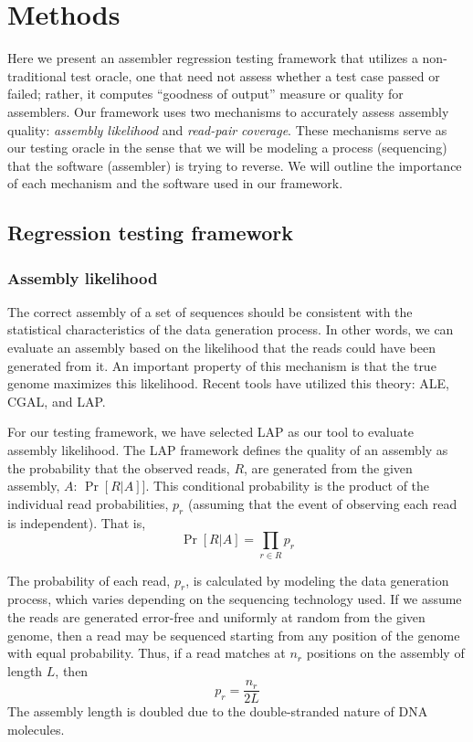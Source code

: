 \documentclass[12pt,\mydriver]{thesis}
\begin{document}
\section{Methods}
\label{methods}

Here we present an assembler regression testing framework that utilizes a non-traditional test oracle, one that need not assess whether a test case passed or failed; rather, it computes ``goodness of output'' measure or quality for assemblers.
Our framework uses two mechanisms to accurately assess assembly quality: \emph{assembly likelihood} and \emph{read-pair coverage}.
These mechanisms serve as our testing oracle in the sense that we will be modeling a process (sequencing) that the software (assembler) is trying to reverse.
We will outline the importance of each mechanism and the software used in our framework.


\subsection{Regression testing framework}
\subsubsection{Assembly likelihood}

The correct assembly of a set of sequences should be consistent with the statistical characteristics of the data generation process\cite{myers1995toward}.
In other words, we can evaluate an assembly based on the likelihood that the reads could have been generated from it.
An important property of this mechanism is that the true genome maximizes this likelihood\cite{LAP}.
Recent tools have utilized this theory: ALE\cite{clark2013ale}, CGAL\cite{rahman2013cgal}, and LAP\cite{LAP}.

For our testing framework, we have selected LAP as our tool to evaluate assembly likelihood.
The LAP framework defines the quality of an assembly as the probability that the observed reads, $R$, are generated from the given assembly, $A$: $\Pr[R|A]]$.
This conditional probability is the product of the individual read probabilities, $p_r$ (assuming that the event of observing each read is independent).  That is,
\begin{equation}
  \label{probability_reads_given_assembly}
  \Pr[R \vert A]=\prod_{r \in R} p_r
\end{equation}

The probability of each read, $p_r$, is calculated by modeling the data generation process, which varies depending on the sequencing technology used.
If we assume the reads are generated error-free and uniformly at random from the given genome, then a read may be sequenced starting from any position of the genome with equal probability.
Thus, if a read
matches at $n_r$ positions on the assembly of length $L$, then
\begin{equation}
  \label{error_free_probability}
  p_r = \frac{n_r}{2L}
\end{equation}
The assembly length is doubled due to the double-stranded nature of DNA molecules.
\end{document}
